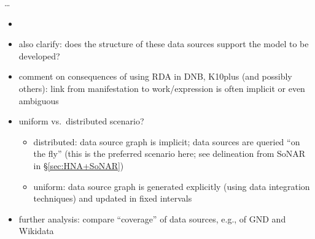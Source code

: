 \dots


\begin{itemize}
  \item
  \item
    also clarify: does the structure of these data sources support the model to be developed?
  \item
    comment on consequences of using RDA in DNB, K10plus (and possibly others): link from manifestation to work/expression is often implicit or even ambiguous
  \item 
    uniform vs.\ distributed scenario?
    \begin{itemize}
      \item
        distributed: data source graph is implicit; data sources are queried \enquote{on the fly}
        (this is the preferred scenario here; see delineation from SoNAR in §\ref{sec:HNA+SoNAR})
      \item
        uniform: data source graph is generated explicitly (using data integration techniques)
        and updated in fixed intervals
    \end{itemize}
  \item
    further analysis: compare \enquote{coverage} of data sources, e.g., of GND and Wikidata
\end{itemize}


